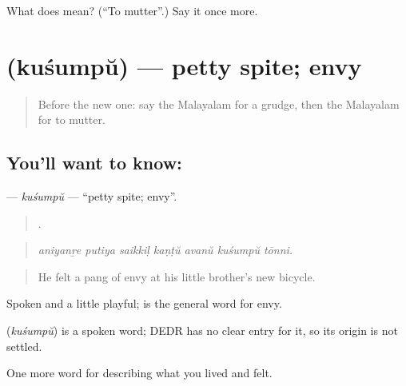 \begin{tcolorbox}[breakable,colback=teal!4,colframe=teal!35!black,title={Before you move on}]
What does  mean? (\textquotedblleft{}To mutter\textquotedblright{}.) Say it once more.
\end{tcolorbox}
\section[\texorpdfstring{\ml{കുശുമ്പ്} (kuśumpŭ)}{കുശുമ്പ് (kuśumpŭ)}]{ (kuśumpŭ) — petty spite; envy}

\label{lesson:ML-C523-kusumpu}



\begin{quote}
Before the new one: say the Malayalam for a grudge, then the Malayalam for to mutter.
\end{quote}

\subsection*{You'll want to know: }
\textbf{} — \emph{kuśumpŭ} — \textquotedblleft{}petty spite; envy\textquotedblright{}.

\begin{quote}
      .
\end{quote}

\begin{quote}
\emph{aniyanṟe putiya saikkiḷ kaṇṭŭ avanŭ kuśumpŭ tōnni.}
\end{quote}

\begin{quote}
He felt a pang of envy at his little brother's new bicycle.
\end{quote}

Spoken and a little playful;  is the general word for envy.

\begin{cousinweb}
\textbf{} (\emph{kuśumpŭ}) is a spoken word; DEDR has no clear entry for it, so its origin is not settled.
\end{cousinweb}

\begin{grammarlens}[title={What you've built}]
One more word for describing what you lived and felt.
\end{grammarlens}

